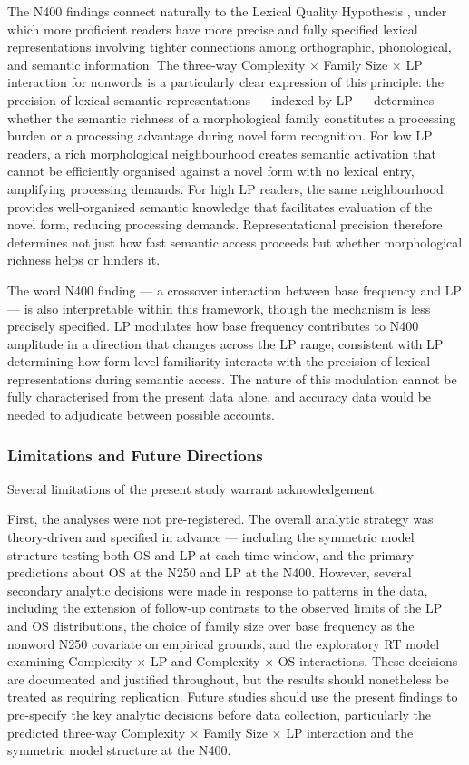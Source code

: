 \documentclass[utf8]{FrontiersinHarvard} %
\begin{document}
	The N400 findings connect naturally to the Lexical Quality Hypothesis \citep{perfettiReadingAbilityLexical2007}, under which more proficient readers have more precise and fully specified lexical representations involving tighter connections among orthographic, phonological, and semantic information. The three-way Complexity $\times$ Family Size $\times$ LP interaction for nonwords is a particularly clear expression of this principle: the precision of lexical-semantic representations --- indexed by LP --- determines whether the semantic richness of a morphological family constitutes a processing burden or a processing advantage during novel form recognition. For low LP readers, a rich morphological neighbourhood creates semantic activation that cannot be efficiently organised against a novel form with no lexical entry, amplifying processing demands. For high LP readers, the same neighbourhood provides well-organised semantic knowledge that facilitates evaluation of the novel form, reducing processing demands. Representational precision therefore determines not just how fast semantic access proceeds but whether morphological richness helps or hinders it.
	
	The word N400 finding --- a crossover interaction between base frequency and LP --- is also interpretable within this framework, though the mechanism is less precisely specified. LP modulates how base frequency contributes to N400 amplitude in a direction that changes across the LP range, consistent with LP determining how form-level familiarity interacts with the precision of lexical representations during semantic access. The nature of this modulation cannot be fully characterised from the present data alone, and accuracy data would be needed to adjudicate between possible accounts.
	
	\subsubsection{Limitations and Future Directions}
	
	Several limitations of the present study warrant acknowledgement.
	
	First, the analyses were not pre-registered. The overall analytic strategy was theory-driven and specified in advance --- including the symmetric model structure testing both OS and LP at each time window, and the primary predictions about OS at the N250 and LP at the N400. However, several secondary analytic decisions were made in response to patterns in the data, including the extension of follow-up contrasts to the observed limits of the LP and OS distributions, the choice of family size over base frequency as the nonword N250 covariate on empirical grounds, and the exploratory RT model examining Complexity $\times$ LP and Complexity $\times$ OS interactions. These decisions are documented and justified throughout, but the results should nonetheless be treated as requiring replication. Future studies should use the present findings to pre-specify the key analytic decisions before data collection, particularly the predicted three-way Complexity $\times$ Family Size $\times$ LP interaction and the symmetric model structure at the N400.
	
\end{document}
